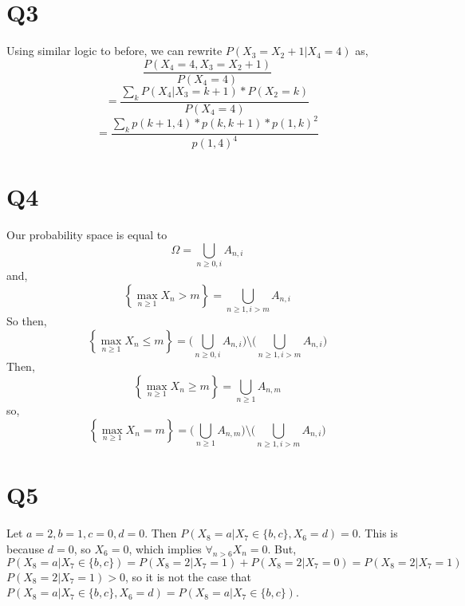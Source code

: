 \documentclass{article}
\begin{document}
\section*{Q3}
Using similar logic to before, we can rewrite $P(X_3 = X_2 + 1 | X_4 = 4)$ as,
\[
\frac{P(X_4 = 4 , X_3 = X_2 + 1)}{P(X_4 = 4)}
\]
\[
= \frac{\sum_k P(X_4 | X_3 = k +1)*P(X_2 = k)}{P(X_4 = 4)}
\]
\[
=\frac{\sum_k p(k+1,4) * p(k,k+1)*p(1,k)^2}{p(1,4)^4}
\]

\section*{Q4}
Our probability space is equal to 
\[
\Omega = \bigcup_{n \geq 0 ,i} A_{n,i}
\]
and, 
\[
\left\{\max_{n \geq 1} X_n > m \right\}  = \bigcup_{n \geq 1, i > m} A_{n,i}
\]
So then, 
\[
\left\{\max_{n \geq 1} X_n \leq m \right\}  =  \bigg( \bigcup_{n \geq 0 ,i} A_{n,i} \bigg) \setminus \bigg( \bigcup_{n \geq 1, i > m} A_{n,i} \bigg)
\]
Then,
\[
\left\{ \max_{n \geq 1} X_n \geq m \right\} = \bigcup_{n \geq 1} A_{n,m}
\]
so,
\[
\left\{\max_{n \geq 1} X_n = m \right\}  = \bigg( \bigcup_{n \geq 1} A_{n,m} \bigg) \setminus \bigg( \bigcup_{n \geq 1 , i > m} A_{n,i} \bigg)
\]

\section*{Q5}
Let $a = 2, b = 1, c = 0, d = 0$. Then $P(X_8 = a | X_7 \in \{b,c\} , X_6 = d) = 0$. This is because $d = 0$, so $X_6 = 0$, which implies $\forall_{n > 6} X_n = 0$.
But, 
\[
P(X_8 = a| X_7 \in \{b,c\}) = P(X_8 = 2 | X_7 = 1) + P(X_8 = 2 | X_7 = 0) = P(X_8 = 2 | X_7 = 1)
\]
$P(X_8 = 2 | X_7 = 1) > 0$, so it is not the case that 
\\
$P(X_8 = a | X_7 \in \{b,c\} , X_6 = d) = P(X_8 = a| X_7 \in \{b,c\})$.
\end{document}
